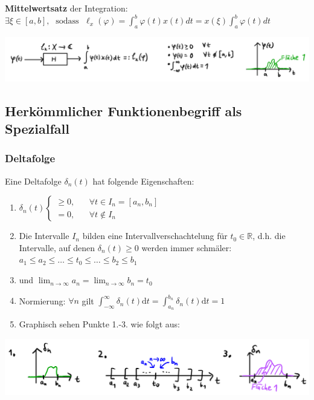 \documentclass[11pt]{article}
\begin{document}
\textbf{Mittelwertsatz} der Integration: $\exists \xi \in [a,b], \; \text{  sodass  } \; \ell_x(\varphi) = \displaystyle\int_a^b \varphi(t)x(t)dt = x(\xi)\displaystyle\int_a^b \varphi(t)dt$
\vspace*{-0.5cm}
\begin{center}
    \includegraphics[width=\linewidth]{docimgs/Funktionale_1.jpg}
\end{center}

\vspace*{-0.5cm}
\subsection*{Herkömmlicher Funktionenbegriff als Spezialfall}
\vspace*{-0.5cm}
\subsubsection*{Deltafolge}
\vspace*{-0.5cm}
Eine Deltafolge $\delta_n(t)$ hat folgende Eigenschaften:
\vspace*{-0.5cm}
\begin{enumerate}
    \item $\delta_n(t) \begin{cases}
        \geq 0, \hspace{20pt} \forall t \in I_n = [a_n, b_n]\\
        = 0, \hspace{20pt} \forall t \notin I_n
    \end{cases}$
    \item Die Intervalle $I_n$ bilden eine Intervallverschachtelung für $t_0 \in \mathbb{R}$, d.h. die Intervalle, auf denen $\delta_n(t) \geq 0$ werden immer schmäler: $a_1 \leq a_2 \leq \dots \leq t_0 \leq \dots \leq b_2 \leq b_1$
    \item[] und $\displaystyle\lim_{n \to \infty}a_n = \displaystyle\lim_{n \to \infty}b_n = t_0$
    \item Normierung: $\forall n$ gilt $\displaystyle\int_{-\infty}^\infty \delta_n(t)\text{d}t = \displaystyle\int_{a_n}^{b_n}\delta_n(t)\text{d}t = 1$
    \item[] Graphisch sehen Punkte 1.-3. wie folgt aus:
\end{enumerate}
\begin{center}
    \includegraphics[width=0.9\linewidth]{docimgs/Deltafolge_1.jpg}
\end{center}
\end{document}
